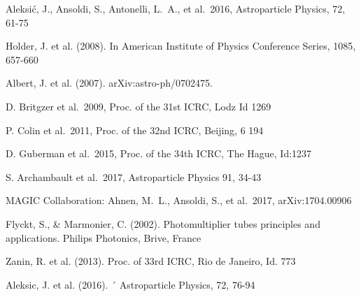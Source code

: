 \documentclass{PoS}
\begin{document}
\begin{thebibliography}{99}

 Aleksi{\'c}, J., Ansoldi, S., Antonelli, L.~A., et al.\ 2016, Astroparticle Physics, 72, 61-75

 Holder, J. et al. (2008). In American Institute of Physics Conference Series, 1085, 657-660

 Albert, J. et al. (2007). arXiv:astro-ph/0702475.

 D. Britgzer et al.\ 2009, Proc. of the 31st ICRC, Lodz Id 1269

 P. Colin et al.\ 2011, Proc. of the 32nd ICRC, Beijing, 6 194

 D. Guberman et al.\ 2015, Proc. of the 34th ICRC, The Hague, Id:1237

 S. Archambault et al.\ 2017, Astroparticle Physics 91, 34-43

 MAGIC Collaboration: Ahnen, M.~L., Ansoldi, S., et al.\ 2017, arXiv:1704.00906

 Flyckt, S., \& Marmonier, C. (2002). Photomultiplier tubes principles and applications. Philips Photonics, Brive, France


 Zanin, R. et al. (2013). Proc. of 33rd ICRC, Rio de Janeiro, Id. 773

 Aleksic, J. et al. (2016). ´ Astroparticle Physics, 72, 76-94

\end{thebibliography}
\end{document}
